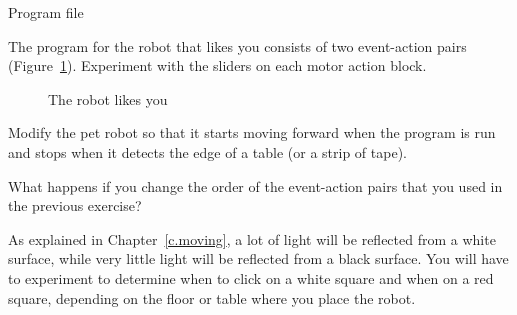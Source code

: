 {\raggedleft \hfill Program file }

The program for the robot that likes you consists of two event-action
pairs (Figure~\ref{fig.likes}). Experiment with the sliders on each
motor action block.

\begin{figure}
\begin{center}
\caption{The robot likes you}\label{fig.likes}
\end{center}
\end{figure}


Modify the pet robot so that it starts moving forward when the program
is run and stops when it detects the edge of a table (or a strip of
tape).


What happens if you change the order of
the event-action pairs that you used in the previous exercise?



As explained in Chapter~\ref{c.moving}, a lot of light will be reflected
from a white surface, while very little light will be reflected from a
black surface. You will have to experiment to determine when to click on
a white square and when on a red square, depending on the floor or
table where you place the robot.



